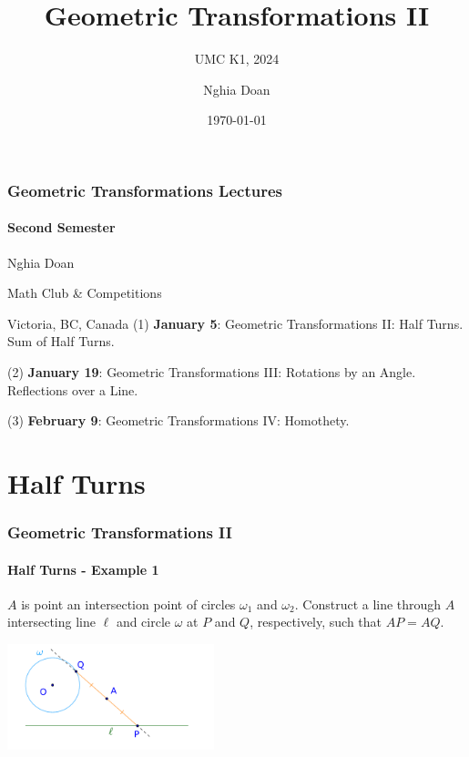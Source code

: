 \documentclass[8pt,xcolor=table,dvipsnames]{beamer}
\title{Geometric Transformations II}
\subtitle{UMC K1, 2024}
\author{Nghia Doan}
\institute{MCC Club \& Competitions}
\date{\today}
\begin{document}
\begin{frame}[t]
    \frametitle{Geometric Transformations Lectures}
    \framesubtitle{Second Semester}
    \bigbreak
    Nghia Doan

    \bigbreak
    Math Club \& Competitions

    Victoria, BC, Canada
    \bigbreak
    \bigbreak
    (1) \textbf{January 5}: Geometric Transformations II: Half Turns. Sum of Half Turns.

    \bigbreak
    (2) \textbf{January 19}: Geometric Transformations III: Rotations by an Angle. Reflections over a Line.

    \bigbreak
    (3) \textbf{February 9}: Geometric Transformations IV: Homothety.
\end{frame}

\section{Half Turns}

\begin{frame}[t]
    \frametitle{Geometric Transformations II}
    \framesubtitle{Half Turns - Example 1}
    \begin{example}
        $A$ is point an intersection point of circles $\omega_1$ and $\omega_2$.
        Construct a line through $A$ intersecting line $\ell$ and circle $\omega$ at $P$ and $Q$, respectively,
        such that $AP = AQ.$
    \end{example}
    \bigbreak
    \begin{center}
        \includegraphics[width=6cm]{./svg/pdf/rotation-p8a.pdf}
    \end{center}
\end{frame}
\end{document}
